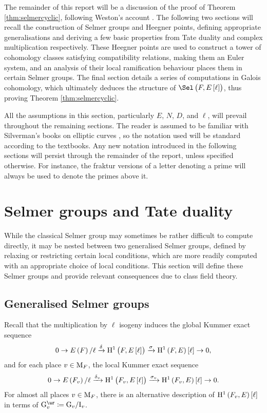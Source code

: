 The remainder of this report will be a discussion of the proof of Theorem \ref{thm:selmercyclic}, following Weston's account \cite{Wes01}. The following two sections will recall the construction of Selmer groups and Heegner points, defining appropriate generalisations and deriving a few basic properties from Tate duality and complex multiplication respectively. These Heegner points are used to construct a tower of cohomology classes satisfying compatibility relations, making them an Euler system, and an analysis of their local ramification behaviour places them in certain Selmer groups. The final section details a series of computations in Galois cohomology, which ultimately deduces the structure of $ \Sel\br{F, E\sbr{\ell}} $, thus proving Theorem \ref{thm:selmercyclic}.

\begin{notation}
All the assumptions in this section, particularly $ E $, $ N $, $ D $, and $ \ell $, will prevail throughout the remaining sections. The reader is assumed to be familiar with Silverman's books on elliptic curves \cite{Sil94, Sil09}, so the notation used will be standard according to the textbooks. Any new notation introduced in the following sections will persist through the remainder of the report, unless specified otherwise. For instance, the fraktur versions of a letter denoting a prime will always be used to denote the primes above it.
\end{notation}

\pagebreak

\section{Selmer groups and Tate duality}

While the classical Selmer group may sometimes be rather difficult to compute directly, it may be nested between two generalised Selmer groups, defined by relaxing or restricting certain local conditions, which are more readily computed with an appropriate choice of local conditions. This section will define these Selmer groups and provide relevant consequences due to class field theory.

\subsection{Generalised Selmer groups}

Recall that the multiplication by $ \ell $ isogeny induces the global Kummer exact sequence
$$ 0 \to E\br{F} / \ell \xrightarrow{\delta} \H^1\br{F, E\sbr{\ell}} \xrightarrow{\sigma} \H^1\br{F, E}\sbr{\ell} \to 0, $$
and for each place $ v \in \mathrm{M}_F $, the local Kummer exact sequence
$$ 0 \to E\br{F_v} / \ell \xrightarrow{\delta_v} \H^1\br{F_v, E\sbr{\ell}} \xrightarrow{\sigma_v} \H^1\br{F_v, E}\sbr{\ell} \to 0. $$
For almost all places $ v \in \mathrm{M}_F $, there is an alternative description of $ \H^1\br{F_v, E}\sbr{\ell} $ in terms of $ \G_v^{\ur} \coloneqq \G_v / \I_v $.

